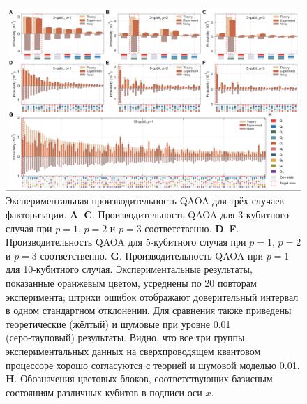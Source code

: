 \begin{figure}
    \centering
    \includegraphics[scale=0.38]{inc/fig_04.png}
    \caption{
        Экспериментальная производительность QAOA для трёх случаев
        факторизации. \textbf{A–C}. Производительность QAOA для 3‑кубитного
        случая при $p = 1$, $p = 2$ и $p = 3$ соответственно. \textbf{D–F}.
        Производительность QAOA для 5‑кубитного случая при $p = 1$, $p = 2$
        и $p = 3$ соответственно. \textbf{G}. Производительность QAOA при $p =
        1$ для 10‑кубитного случая. Экспериментальные результаты, показанные
        оранжевым цветом, усреднены по 20 повторам эксперимента; штрихи ошибок
        отображают доверительный интервал в одном стандартном отклонении. Для
        сравнения также приведены теоретические (жёлтый) и шумовые при
        уровне 0.01 (серо‑тауповый) результаты. Видно, что все три группы
        экспериментальных данных на сверхпроводящем квантовом процессоре хорошо
        согласуются с теорией и шумовой моделью 0.01. \textbf{H}. Обозначения
        цветовых блоков, соответствующих базисным состояниям различных кубитов
        в подписи оси $x$.
    }
    \label{fig:fig04}
\end{figure}

